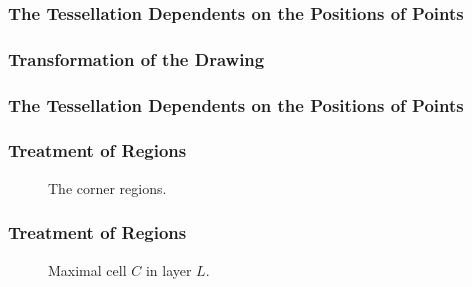 \documentclass{beamer}
\begin{document}
\begin{frame}
\frametitle{The Tessellation Dependents on the Positions of Points}
\begin{figure}[!ht]
\begin{center}

\end{center}
\end{figure}
\end{frame}

\begin{frame}
\frametitle{Transformation of the Drawing}
\begin{figure}[!ht]
\begin{center}
\resizebox{6cm}{!}{%

}
\end{center}
\end{figure}
\end{frame}

\begin{frame}
\frametitle{The Tessellation Dependents on the Positions of Points}
\begin{figure}[!ht]
\begin{center}

\end{center}
\end{figure}
\end{frame}


\begin{frame}
\frametitle{Treatment of Regions}
\begin{figure}%
\begin{center}
\resizebox{8cm}{!}{%

}
\end{center}
\caption{The corner regions.}
\end{figure}
\end{frame}


\begin{frame}
\frametitle{Treatment of Regions}
\begin{figure}%
\begin{center}
\resizebox{8cm}{!}{%

}
\end{center}
\caption{Maximal cell $C$ in layer $L$.}
\end{figure}
\end{frame}
\end{document}
